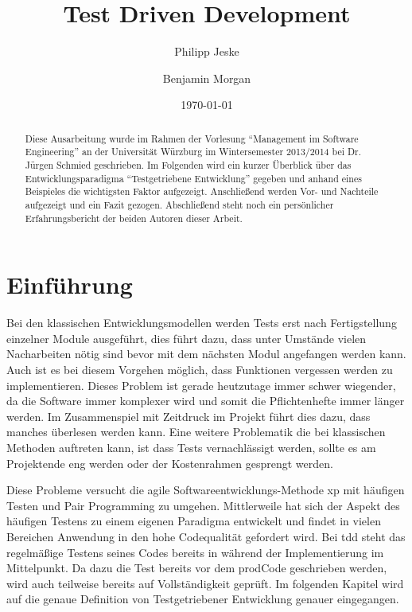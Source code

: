 \documentclass{mitschrift}
\title{Test Driven Development}
\author{Philipp Jeske \and Benjamin Morgan}
\date{\today}
\newcommand{\pje}{\marginpar{Philipp\\Jeske}}
\begin{document}
\maketitle

\tableofcontents

\begin{abstract}
 Diese Ausarbeitung wurde im Rahmen der Vorlesung "`Management im Software Engineering"' an der Universität Würzburg im Wintersemester 2013/2014 bei Dr. Jürgen Schmied geschrieben. Im Folgenden wird ein kurzer Überblick über das Entwicklungsparadigma "`Testgetriebene Entwicklung"' gegeben und anhand eines Beispieles die wichtigsten Faktor aufgezeigt. Anschließend werden Vor- und Nachteile aufgezeigt und ein Fazit gezogen. Abschließend steht noch ein persönlicher Erfahrungsbericht der beiden Autoren dieser Arbeit.
\end{abstract}

\chapter{Einführung}
\pje
Bei den klassischen Entwicklungsmodellen werden Tests erst nach Fertigstellung einzelner Module ausgeführt, dies führt dazu, dass unter Umstände vielen Nacharbeiten nötig sind bevor mit dem nächsten Modul angefangen werden kann. Auch ist es bei diesem Vorgehen möglich, dass Funktionen vergessen werden zu implementieren. Dieses Problem ist gerade heutzutage immer schwer wiegender, da die Software immer komplexer wird und somit die Pflichtenhefte immer länger werden. Im Zusammenspiel mit Zeitdruck im Projekt führt dies dazu, dass manches überlesen werden kann. Eine weitere Problematik die bei klassischen Methoden auftreten kann, ist dass Tests vernachlässigt werden, sollte es am Projektende eng werden oder der Kostenrahmen gesprengt werden.

Diese Probleme versucht die agile Softwareentwicklungs-Methode \gls{xp} mit häufigen Testen und Pair Programming zu umgehen. Mittlerweile hat sich der Aspekt des häufigen Testens zu einem eigenen Paradigma entwickelt und findet in vielen Bereichen Anwendung in den hohe Codequalität gefordert wird. Bei \gls{tdd} steht das regelmäßige Testens seines Codes bereits in während der Implementierung im Mittelpunkt. Da dazu die Test bereits vor dem \gls{prodCode} geschrieben werden, wird auch teilweise bereits auf Vollständigkeit geprüft. Im folgenden Kapitel wird auf die genaue Definition von Testgetriebener Entwicklung genauer eingegangen.
\end{document}
